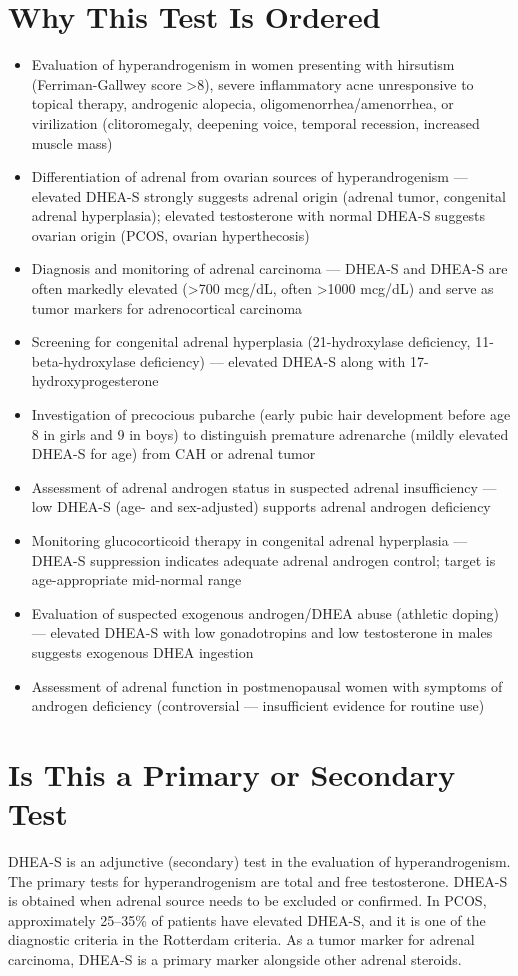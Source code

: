 \section*{Why This Test Is Ordered}
\begin{itemize}
  \item Evaluation of hyperandrogenism in women presenting with hirsutism (Ferriman-Gallwey score >8), severe inflammatory acne unresponsive to topical therapy, androgenic alopecia, oligomenorrhea/amenorrhea, or virilization (clitoromegaly, deepening voice, temporal recession, increased muscle mass)
  \item Differentiation of adrenal from ovarian sources of hyperandrogenism --- elevated DHEA-S strongly suggests adrenal origin (adrenal tumor, congenital adrenal hyperplasia); elevated testosterone with normal DHEA-S suggests ovarian origin (PCOS, ovarian hyperthecosis)
  \item Diagnosis and monitoring of adrenal carcinoma --- DHEA-S and DHEA-S are often markedly elevated (>700 mcg/dL, often >1000 mcg/dL) and serve as tumor markers for adrenocortical carcinoma
  \item Screening for congenital adrenal hyperplasia (21-hydroxylase deficiency, 11-beta-hydroxylase deficiency) --- elevated DHEA-S along with 17-hydroxyprogesterone
  \item Investigation of precocious pubarche (early pubic hair development before age 8 in girls and 9 in boys) to distinguish premature adrenarche (mildly elevated DHEA-S for age) from CAH or adrenal tumor
  \item Assessment of adrenal androgen status in suspected adrenal insufficiency --- low DHEA-S (age- and sex-adjusted) supports adrenal androgen deficiency
  \item Monitoring glucocorticoid therapy in congenital adrenal hyperplasia --- DHEA-S suppression indicates adequate adrenal androgen control; target is age-appropriate mid-normal range
  \item Evaluation of suspected exogenous androgen/DHEA abuse (athletic doping) --- elevated DHEA-S with low gonadotropins and low testosterone in males suggests exogenous DHEA ingestion
  \item Assessment of adrenal function in postmenopausal women with symptoms of androgen deficiency (controversial --- insufficient evidence for routine use)
\end{itemize}

\section*{Is This a Primary or Secondary Test}
DHEA-S is an adjunctive (secondary) test in the evaluation of hyperandrogenism. The primary tests for hyperandrogenism are total and free testosterone. DHEA-S is obtained when adrenal source needs to be excluded or confirmed. In PCOS, approximately 25--35\% of patients have elevated DHEA-S, and it is one of the diagnostic criteria in the Rotterdam criteria. As a tumor marker for adrenal carcinoma, DHEA-S is a primary marker alongside other adrenal steroids.

